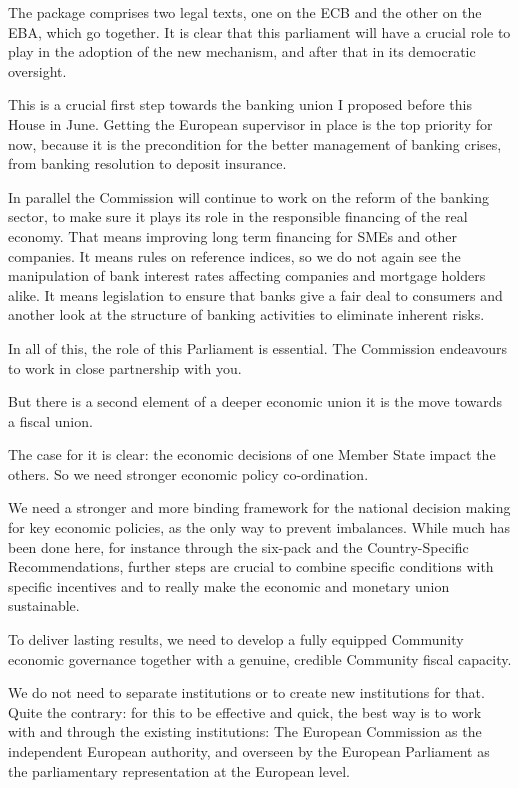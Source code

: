 \documentclass[a4paper,11pt]{article}
\begin{document}
The package comprises two legal texts, one on the ECB and the other on the EBA, which go together. It is clear that this parliament will have a crucial role to play in the adoption of the new mechanism, and after that in its democratic oversight.

This is a crucial first step towards the banking union I proposed before this House in June. Getting the European supervisor in place is the top priority for now, because it is the precondition for the better management of banking crises, from banking resolution to deposit insurance.

In parallel the Commission will continue to work on the reform of the banking sector, to make sure it plays its role in the responsible financing of the real economy. That means improving long term financing for SMEs and other companies. It means rules on reference indices, so we do not again see the manipulation of bank interest rates affecting companies and mortgage holders alike. It means legislation to ensure that banks give a fair deal to consumers and another look at the structure of banking activities to eliminate inherent risks.

In all of this, the role of this Parliament is essential. The Commission endeavours to work in close partnership with you.

But there is a second element of a deeper economic union it is the move towards a fiscal union.

The case for it is clear: the economic decisions of one Member State impact the others. So we need stronger economic policy co-ordination.

We need a stronger and more binding framework for the national decision making for key economic policies, as the only way to prevent imbalances. While much has been done here, for instance through the six-pack and the Country-Specific Recommendations, further steps are crucial to combine specific conditions with specific incentives and to really make the economic and monetary union sustainable.

To deliver lasting results, we need to develop a fully equipped Community economic governance together with a genuine, credible Community fiscal capacity.

We do not need to separate institutions or to create new institutions for that. Quite the contrary: for this to be effective and quick, the best way is to work with and through the existing institutions: The European Commission as the independent European authority, and overseen by the European Parliament as the parliamentary representation at the European level.
\end{document}
